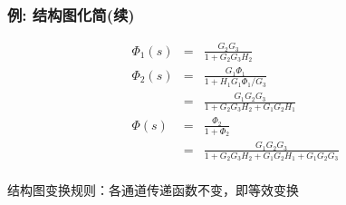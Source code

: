 \documentclass{article}
\begin{document}
\begin{frame}
\frametitle{例: 结构图化简(续)}
\label{sec-3-2-5}



\begin{eqnarray}
\Phi_1(s) &=& \frac{G_2 G_3}{1+G_2 G_3 H_2} \\
\Phi_2(s) &=& \frac{G_1 \Phi_1}{1+H_1G_1 \Phi_1 / G_3} \\
          &=& \frac{G_1 G_2 G_3}{1+G_2 G_3 H_2+G_1G_2H_1} \\
\Phi(s)   &=& \frac{\Phi_2}{1+ \Phi_2} \\
          &=& \frac{G_1 G_2 G_3}{1+G_2 G_3 H_2+G_1G_2H_1+G_1 G_2 G_3} \\
\end{eqnarray}

结构图变换规则：各通道传递函数不变，即等效变换
\end{frame}
\end{document}
